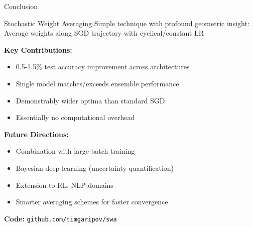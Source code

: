 \documentclass{beamer}
\begin{document}
\begin{frame}{Conclusion}

\begin{alertblock}{Stochastic Weight Averaging}
Simple technique with profound geometric insight:\\
Average weights along SGD trajectory with cyclical/constant LR
\end{alertblock}

\vspace{0.3cm}

\textbf{Key Contributions:}
\begin{itemize}
    \item 0.5-1.5\% test accuracy improvement across architectures
    \item Single model matches/exceeds ensemble performance
    \item Demonstrably wider optima than standard SGD
    \item Essentially no computational overhead
\end{itemize}

\vspace{0.3cm}

\textbf{Future Directions:}
\begin{itemize}
    \item Combination with large-batch training
    \item Bayesian deep learning (uncertainty quantification)
    \item Extension to RL, NLP domains
    \item Smarter averaging schemes for faster convergence
\end{itemize}

\vspace{0.3cm}

\begin{center}
\textbf{Code:} \texttt{github.com/timgaripov/swa}
\end{center}

\end{frame}
\end{document}
